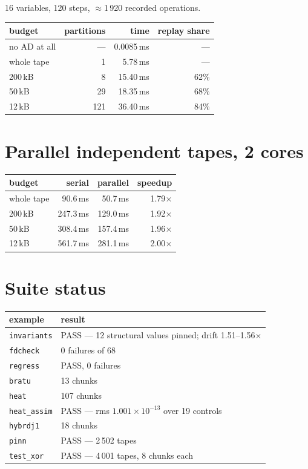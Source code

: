 \documentclass[11pt,a4paper]{report}
\newcommand{\code}[1]{\texttt{#1}}
\begin{document}
16 variables, 120 steps, $\approx$1\,920 recorded operations.

\begin{center}
\begin{tabular}{@{}lrrr@{}}
\toprule
budget & partitions & time & replay share \\
\midrule
no AD at all & --- & 0.0085\,ms & --- \\
whole tape   & 1   & 5.78\,ms   & --- \\
200\,kB      & 8   & 15.40\,ms  & 62\% \\
50\,kB       & 29  & 18.35\,ms  & 68\% \\
12\,kB       & 121 & 36.40\,ms  & 84\% \\
\bottomrule
\end{tabular}
\end{center}

\section{Parallel independent tapes, 2 cores}

\begin{center}
\begin{tabular}{@{}lrrr@{}}
\toprule
budget & serial & parallel & speedup \\
\midrule
whole tape & 90.6\,ms & 50.7\,ms & 1.79$\times$ \\
200\,kB & 247.3\,ms & 129.0\,ms & 1.92$\times$ \\
50\,kB & 308.4\,ms & 157.4\,ms & 1.96$\times$ \\
12\,kB & 561.7\,ms & 281.1\,ms & 2.00$\times$ \\
\bottomrule
\end{tabular}
\end{center}

\section{Suite status}

\begin{center}
\begin{tabular}{@{}ll@{}}
\toprule
example & result \\
\midrule
\code{invariants} & PASS --- 12 structural values pinned; drift 1.51--1.56$\times$ \\
\code{fdcheck}    & 0 failures of 68 \\
\code{regress}    & PASS, 0 failures \\
\code{bratu}      & 13 chunks \\
\code{heat}       & 107 chunks \\
\code{heat\_assim}& PASS --- rms $1.001\times10^{-13}$ over 19 controls \\
\code{hybrdj1}    & 18 chunks \\
\code{pinn}       & PASS --- 2\,502 tapes \\
\code{test\_xor}  & PASS --- 4\,001 tapes, 8 chunks each \\
\bottomrule
\end{tabular}
\end{center}
\end{document}
